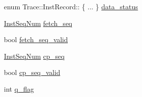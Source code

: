 \begin{DoxyCompactItemize}
\begin{tabbing}
\end{tabbing}\item 
enum Trace::InstRecord:: \{ ... \}  \hyperlink{classTrace_1_1InstRecord_a3521d133b67276195cc3d5a7842eecb3}{data\_\-status}
\item 
\hyperlink{inst__seq_8hh_a258d93d98edaedee089435c19ea2ea2e}{InstSeqNum} \hyperlink{classTrace_1_1InstRecord_a0a6c948934ef02a8ab11296a3e6b2d60}{fetch\_\-seq}
\item 
bool \hyperlink{classTrace_1_1InstRecord_a1f1c675e048b2aa758f34180db170b0e}{fetch\_\-seq\_\-valid}
\item 
\hyperlink{inst__seq_8hh_a258d93d98edaedee089435c19ea2ea2e}{InstSeqNum} \hyperlink{classTrace_1_1InstRecord_a2ab29e32580e969e06d6870cc670c677}{cp\_\-seq}
\item 
bool \hyperlink{classTrace_1_1InstRecord_a9948ee71944b10cc325a58fcf35d7203}{cp\_\-seq\_\-valid}
\item 
int \hyperlink{classTrace_1_1InstRecord_abdd3d802d4b2f522680593959ae85a8e}{q\_\-flag}
\end{DoxyCompactItemize}


